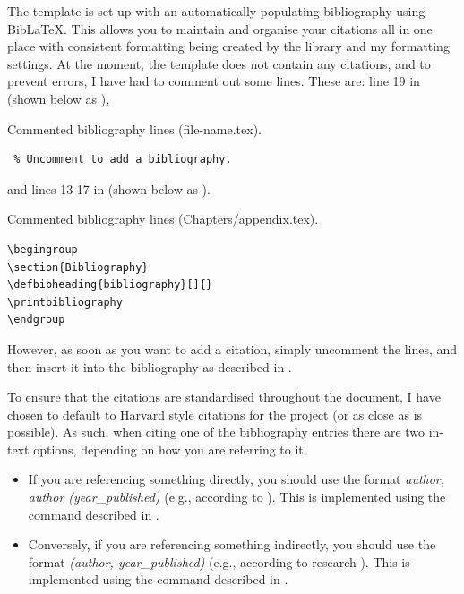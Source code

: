 
The template is set up with an automatically populating bibliography using Bib\LaTeX. 
This allows you to maintain and organise your citations all in one place with consistent formatting being created by the library and my formatting settings. 
At the moment, the template does not contain any citations, and to prevent errors, I have had to comment out some lines. 
These are: line 19 in  (shown below as ),

\begin{newsnippet}{Commented bibliography lines (file-name.tex).}
    \begin{verbatim}
 % Uncomment to add a bibliography.
    \end{verbatim}
\end{newsnippet}

\noindent and lines 13-17 in  (shown below as ).

\begin{newsnippet}{Commented bibliography lines (Chapters/appendix.tex).}
    \begin{verbatim}
\begingroup
\section{Bibliography}
\defbibheading{bibliography}[]{}
\printbibliography
\endgroup
    \end{verbatim}
\end{newsnippet}

\noindent However, as soon as you want to add a citation, simply uncomment the lines, and then insert it into the bibliography as described in .



To ensure that the citations are standardised throughout the document, I have chosen to default to Harvard style citations for the project (or as close as is possible). 
As such, when citing one of the bibliography entries there are two in-text options, depending on how you are referring to it. 
\begin{itemize}
    \item If you are referencing something directly, you should use the format \textit{author, author (year\_published)} (e.g., according to ). 
    This is implemented using the command described in .
    \item Conversely, if you are referencing something indirectly, you should use the format \textit{(author, year\_published)} (e.g., according to research ). 
    This is implemented using the command described in .
\end{itemize}

